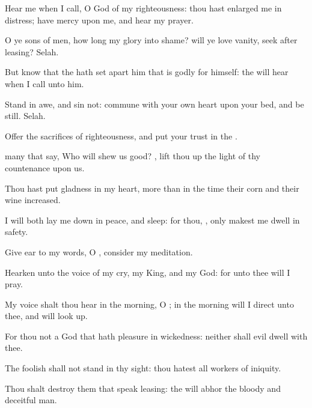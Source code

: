 {\Q {}Hear me when I
call, O
God of my
righteousness: thou hast
enlarged me
{} in
distress; have
mercy upon me, and
hear my
prayer.


\par }{\Q {}O ye
sons of
men, how
long
{} my
glory into
shame?
{} will ye
love
vanity,
{}
seek after
leasing?
Selah.


\par }{\Q {}But
know that the
{} hath set
apart him that is
godly for himself: the
{} will
hear when I
call unto him.


\par }{\Q {}Stand in
awe, and
sin not:
commune with your own
heart upon your
bed, and be
still.
Selah.


\par }{\Q {}Offer the
sacrifices of
righteousness, and put your
trust in the
{}.


\par }{\BB \par }
{\Q {}
many that
say, Who will
shew us
{}
good?
{}, lift thou
up the
light of thy
countenance upon us.


\par }{\Q {}Thou hast
put
gladness in my
heart, more than in the
time
{} their
corn and their
wine
increased.


\par }{\Q {}I will
both lay me
down in
peace, and
sleep: for thou,
{},
only makest me
dwell in
safety.




\par }
{\Q {}Give
ear to my
words, O
{},
consider my
meditation.


\par }{\Q {}Hearken unto the
voice of my
cry, my
King, and my
God: for unto thee will I
pray.


\par }{\Q {}My
voice shalt thou
hear in the
morning, O
{}; in the
morning will I
direct
{} unto thee, and will look
up.


\par }{\Q {}For thou
{} not a
God that hath
pleasure in
wickedness: neither shall
evil
dwell with thee.


\par }{\Q {}The
foolish shall not
stand in thy
sight: thou
hatest all
workers of
iniquity.


\par }{\Q {}Thou shalt
destroy them that
speak
leasing: the
{} will
abhor the
bloody and
deceitful
man.


\par }{\BB \par }
